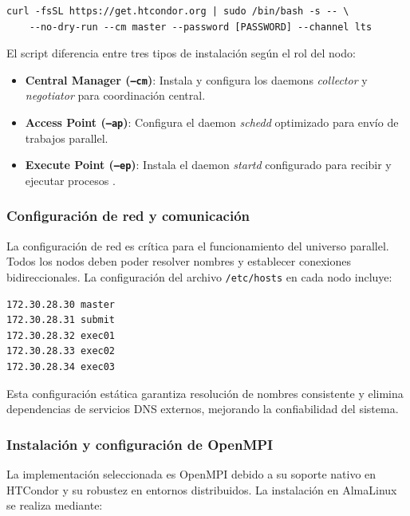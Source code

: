 \begin{verbatim}
curl -fsSL https://get.htcondor.org | sudo /bin/bash -s -- \
    --no-dry-run --cm master --password [PASSWORD] --channel lts
\end{verbatim}

El script diferencia entre tres tipos de instalación según el rol del nodo:

\begin{itemize}
	\item \textbf{Central Manager (\texttt{--cm})}: Instala y configura los daemons \textit{collector} y \textit{negotiator} para coordinación central.

	\item \textbf{Access Point (\texttt{--ap})}: Configura el daemon \textit{schedd} optimizado para envío de trabajos parallel.

	\item \textbf{Execute Point (\texttt{--ep})}: Instala el daemon \textit{startd} configurado para recibir y ejecutar procesos \MPI.
\end{itemize}

\subsubsection{Configuración de red y comunicación}
\noindent

La configuración de red es crítica para el funcionamiento del universo parallel. Todos los nodos deben poder resolver nombres y establecer conexiones bidireccionales. La configuración del archivo \texttt{/etc/hosts} en cada nodo incluye:

\begin{verbatim}
172.30.28.30 master
172.30.28.31 submit
172.30.28.32 exec01
172.30.28.33 exec02
172.30.28.34 exec03
\end{verbatim}

Esta configuración estática garantiza resolución de nombres consistente y elimina dependencias de servicios DNS externos, mejorando la confiabilidad del sistema.

\subsubsection{Instalación y configuración de OpenMPI}
\noindent

La implementación \MPI seleccionada es OpenMPI debido a su soporte nativo en HTCondor y su robustez en entornos distribuidos. La instalación en AlmaLinux se realiza mediante:

